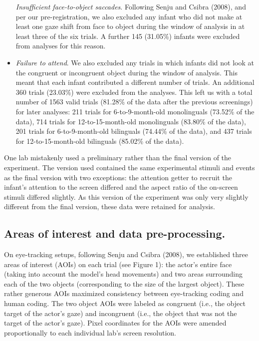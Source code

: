 \documentclass[english,,man,floatsintext]{apa6}
\begin{document}
\begin{itemize}
  \emph{Insufficient face-to-object saccades}. Following Senju and Csibra (2008), and per our pre-registration, we also excluded any infant who did not make at least one gaze shift from face to object during the window of analysis in at least three of the six trials. A further 145 (31.05\%) infants were excluded from analyses for this reason.
\item
  \emph{Failure to attend}. We also excluded any trials in which infants did not look at the congruent or incongruent object during the window of analysis. This meant that each infant contributed a different number of trials. An additional 360 trials (23.03\%) were excluded from the analyses. This left us with a total number of 1563 valid trials (81.28\% of the data after the previous screenings) for later analyses: 211 trials for 6-to-9-month-old monolinguals (73.52\% of the data), 714 trials for 12-to-15-month-old monolinguals (83.80\% of the data), 201 trials for 6-to-9-month-old bilinguals (74.44\% of the data), and 437 trials for 12-to-15-month-old bilinguals (85.02\% of the data).
\end{itemize}

One lab mistakenly used a preliminary rather than the final version of the experiment. The version used contained the same experimental stimuli and events as the final version with two exceptions: the attention getter to recruit the infant's attention to the screen differed and the aspect ratio of the on-screen stimuli differed slightly. As this version of the experiment was only very slightly different from the final version, these data were retained for analysis.

\hypertarget{areas-of-interest-and-data-pre-processing.}{%
\subsection{Areas of interest and data pre-processing.}\label{areas-of-interest-and-data-pre-processing.}}

On eye-tracking setups, following Senju and Csibra (2008), we established three areas of interest (AOIs) on each trial (see Figure 1): the actor's entire face (taking into account the model's head movements) and two areas surrounding each of the two objects (corresponding to the size of the largest object). These rather generous AOIs maximized consistency between eye-tracking coding and human coding. The two object AOIs were labeled as congruent (i.e., the object target of the actor's gaze) and incongruent (i.e., the object that was not the target of the actor's gaze). Pixel coordinates for the AOIs were amended proportionally to each individual lab's screen resolution.
\end{document}

